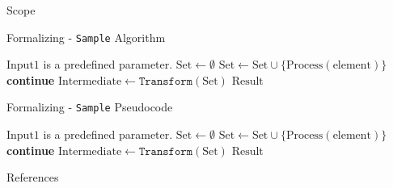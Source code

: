 \documentclass[presentation, aspectratio=169]{beamer}
\begin{document}
\appendix
					
\begin{frame}[label=scope]{Scope \hyperlink{objectives}{}}
	\note{}
\end{frame}

\begin{frame}[label=algo1]{Formalizing - \texttt{Sample} Algorithm \hyperlink{process1}{}}
	\begin{algorithm}[H]
		\small
		\caption{$(\text{Result}) \gets \texttt{Sample}(\text{Input1})$}
		\label{alg:algo1}
		\begin{algorithmic}[1]
			\Require $\text{Input1}$ is a predefined parameter.
			\State $\text{Set} \gets \emptyset$
			\State $\text{Set} \gets \text{Set} \cup \{\text{Process}(\text{element})\}$
			\Else
			\State \textbf{continue}
			\EndIf
			\EndFor
			\State $\text{Intermediate} \gets \texttt{Transform}(\text{Set})$
			\State \Return $\text{Result}$
		\end{algorithmic}
	\end{algorithm}
	\note{}
\end{frame}
	
\begin{frame}[label=pseudocode1]{Formalizing - \texttt{Sample} Pseudocode \hyperlink{process1}{}}
	\begin{algorithm}[H]
		\small
		\caption{$(\text{Result}) \gets \texttt{Sample}(\text{Input1})$}
		\label{alg:pseudocode1}
		\begin{algorithmic}[1]
			\Require $\text{Input1}$ is a predefined parameter.
			\State $\text{Set} \gets \emptyset$
			\State $\text{Set} \gets \text{Set} \cup \{\text{Process}(\text{element})\}$
			\Else
			\State \textbf{continue}
			\EndIf
			\EndFor
			\State $\text{Intermediate} \gets \texttt{Transform}(\text{Set})$
			\State \Return $\text{Result}$
		\end{algorithmic}
	\end{algorithm}
	\note{}
\end{frame}



\begin{frame}{References}
	\printbibliography[heading=none]
\end{frame}
					
\end{document}
